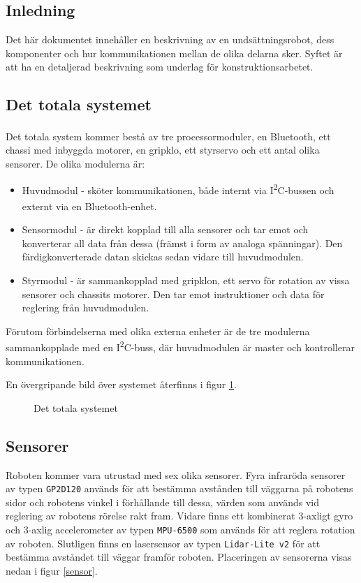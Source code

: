 \documentclass[11pt]{article}
\begin{document}
\begin{flushleft}
\section{Inledning}
Det här dokumentet innehåller en beskrivning av en undsättningsrobot, dess komponenter och hur kommunikationen mellan de olika delarna sker. Syftet är att ha en detaljerad beskrivning som underlag för konstruktionsarbetet.

\subsection{Det totala systemet}
Det totala system kommer bestå av tre processormoduler, en Bluetooth\textsuperscript{\circledR}, ett chassi med inbyggda motorer, en gripklo, ett styrservo och ett antal olika sensorer. De olika modulerna är:
\begin{itemize}
	\item Huvudmodul - sköter kommunikationen, både internt via I\textsuperscript{2}C-bussen och externt via en Bluetooth\textsuperscript{\circledR}-enhet.
	\item Sensormodul - är direkt kopplad till alla sensorer och tar emot och konverterar all data från dessa (främst i form av analoga spänningar). Den färdigkonverterade datan skickas sedan vidare till huvudmodulen.
	\item Styrmodul - är sammankopplad med gripklon, ett servo för rotation av vissa sensorer och chassits motorer. Den tar emot instruktioner och data för reglering från huvudmodulen.
\end{itemize}
Förutom förbindelserna med olika externa enheter är de tre modulerna sammankopplade med en I\textsuperscript{2}C-buss, där huvudmodulen är master och kontrollerar kommunikationen. 

En övergripande bild över systemet återfinns i figur \ref{overview}.

\begin{figure}[!htbp]
\centering
\noindent\resizebox{\linewidth}{!}{
	}
	\caption{Det totala systemet \label{overview}}	
\end{figure}

\FloatBarrier
\subsection{Sensorer}
Roboten kommer vara utrustad med sex olika sensorer. Fyra infraröda sensorer av typen \verb+GP2D120+ används för att bestämma avstånden till väggarna på robotens sidor och robotens vinkel i förhållande till dessa, värden som används vid reglering av robotens rörelse rakt fram. Vidare finns ett kombinerat 3-axligt gyro och 3-axlig accelerometer av typen \verb+MPU-6500+ som används för att reglera rotation av roboten. Slutligen finns en lasersensor av typen \verb+Lidar-Lite v2+ för att bestämma avståndet till väggar framför roboten. Placeringen av sensorerna visas nedan i figur \ref{sensor}.


\end{flushleft}
\end{document}
